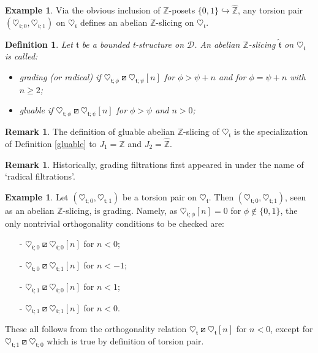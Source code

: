 \documentclass{article}
\newtheorem{defn}[thm]{Definition}
\theoremstyle{definition}
\newtheorem{exmp}[thm]{Example}
\newtheorem{rem}[thm]{Remark}
\newcommand{\Z}{\mathbb{Z}}
\newcommand{\tee}{\mathfrak{t}}
\newcommand{\orth}{\boxslash}
\begin{document}
\begin{exmp}
Via the obvious inclusion of $\Z$-posets $\{0,1\}\hookrightarrow\hat{\Z}$, any torsion pair $(\heartsuit_{\tee;0},\heartsuit_{\tee;1})$ on $\heartsuit_{\mathfrak{t}}$ defines an abelian $\Z$-slicing on $\heartsuit_{\mathfrak{t}}$.
\end{exmp}
\begin{defn}
Let $\mathfrak{t}$ be a bounded t-structure on $\mathscr{D}$. An abelian $\mathbb{Z}$-slicing $\hat{\tee}$ on $\heartsuit_{\mathfrak{t}}$ is called:
\begin{itemize}
\item \emph{grading %
} (or \emph{radical}) if $\heartsuit_{\tee;\phi}\orth\heartsuit_{\tee;\psi}[n]$ for $\phi>\psi+n$ and %
 for $\phi=\psi+n$ with $n\geq 2$; 
\item \emph{gluable} if $\heartsuit_{\tee;\phi}\orth \heartsuit_{\tee;\psi}[n]$ %
for $\phi>\psi$ and $n>0$;
\end{itemize} 
\end{defn}
\begin{rem}\label{special-gluable}
The definition of gluable abelian $\Z$-slicing of $\heartsuit_\tee$ is the specialization of Definition \ref{gluable} to $J_1=\Z$ and $J_2=\hat{\Z}$.
\end{rem}
\begin{rem}
Historically, grading filtrations first appeared in \cite{ekh} under the name of `radical filtrations'.%
\end{rem}
\begin{exmp}
Let  $(\heartsuit_{\tee;0},\heartsuit_{\tee;1})$ be a torsion pair on $\heartsuit_{\mathfrak{t}}$. Then $(\heartsuit_{\tee;0},\heartsuit_{\tee;1})$, seen as an abelian $\Z$-slicing, is grading. Namely, as $\heartsuit_{\tee;\phi}[n]=0$ for $\phi \notin\{ 0,1\}$, the only nontrivial orthogonality conditions to be checked are:
\begin{itemize}
\item[-] $\heartsuit_{\tee;0}\orth\heartsuit_{\tee;0}[n]$ for $n<0$;
\item[-] $\heartsuit_{\tee;0}\orth\heartsuit_{\tee;1}[n]$ for $n<-1$;
\item[-] $\heartsuit_{\tee;1}\orth\heartsuit_{\tee;0}[n]$ for $n<1$;
\item[-] $\heartsuit_{\tee;1}\orth\heartsuit_{\tee;1}[n]$ for $n<0$.
\end{itemize}
These all follows from the orthogonality relation $\heartsuit_{\tee}\orth \heartsuit_\tee[n]$ for $n< 0$, except for $\heartsuit_{\tee;1}\orth\heartsuit_{\tee;0}$ which is true by definition of torsion pair.
\end{exmp}
\end{document}
